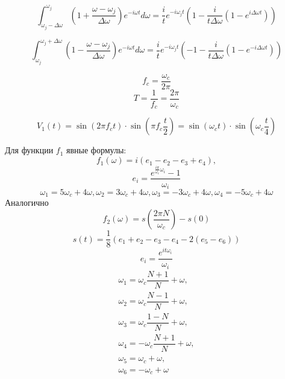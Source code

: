 \documentclass[a4paper, 12pt]{article}
\newcommand{\ww}{\omega}
\newcommand{\dw}{\Delta \omega}
\begin{document}
    
\begin{equation}
    \int_{\ww_j-\dw}^{\ww_j} \left(1+ \frac{\ww-\ww_j}{\dw} \right) e^{- i \ww t}d\ww=
\frac{i}{t} e^{- i \ww_j t}\left(1-\frac{i}{t\dw}\left( 1-e^{i \dw t} \right)  \right) 
\end{equation}

\begin{equation}
    \int_{\ww_j}^{\ww_j+\dw} \left(1- \frac{\ww-\ww_j}{\dw} \right) e^{- i \ww t}d\ww=
\frac{i}{t} e^{- i \ww_j t}\left(-1-\frac{i}{t\dw}\left( 1-e^{-i \dw t} \right)  \right)
\end{equation}

\begin{equation}
    f_c=\frac{\ww_c}{2 \pi}
\end{equation}
\begin{equation}
    T=\frac{1}{f_c}=\frac{2 \pi}{\ww_c}
\end{equation}

\begin{equation}
    V_1(t)=\sin (2 \pi f_c t) \cdot \sin(\pi f_c \frac{t}{2})=\sin (\ww_c t) \cdot \sin(\ww_c \frac{t}{4})
\end{equation}

Для функции $f_1$ явные формулы:
\begin{equation}
    f_1(\ww)=i(e_1-e_2-e_3+e_4),
\end{equation}
\begin{equation}
    e_i=\dfrac{e^{\frac{i \pi}{\ww_c} \ww_i} -1}{\ww_i}
\end{equation}
\begin{equation}
    \ww_1=5\ww_c+4 \ww,\ww_2=3\ww_c+4 \ww,\ww_3=-3\ww_c+4 \ww,\ww_4=-5\ww_c+4 \ww
\end{equation}
Аналогично
\begin{equation}
    f_2(\ww)=s\left(\dfrac{2 \pi N}{\ww_c}\right) - s(0)
\end{equation}
\begin{equation}
    s(t)=\frac{1}{8} \left(e_1+e_2-e_3-e_4-2(e_5-e_6)    \right)
\end{equation}
\begin{equation}
    e_i=\dfrac{e^{i t \ww_i}}{\ww_i}
\end{equation}
\begin{multline}
    \ww_1=\ww_c \dfrac{N+1}{N}+\ww,\\
    \ww_2=\ww_c \dfrac{N-1}{N}+\ww,\\
    \ww_3=\ww_c \dfrac{1-N}{N}+\ww,\\
    \ww_4=-\ww_c\dfrac{N+1}{N}+\ww,\\
    \ww_5=\ww_c +\ww,\\
    \ww_6=-\ww_c +\ww
\end{multline}
\end{document}

